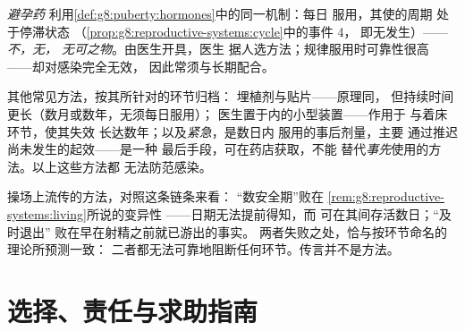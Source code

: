 \begin{definition}\label{def:g8:contraception:pill}
\emph{避孕药}
利用\cref{def:g8:puberty:hormones}中的同一机制：每日
服用，其使的周期
处于停滞状态
（\cref{prop:g8:reproductive-systems:cycle}中的事件 4，
即无发生）——\emph{不，无，
无可之物}。由医生开具，医生
据人选方法；规律服用时可靠性很高
——却对感染完全无效，
因此常须与长期配合。
\end{definition}

\begin{example}\label{ex:g8:contraception:shelf}
其他常见方法，按其所针对的环节归档：
埋植剂与贴片——原理同，
但持续时间更长（数月或数年，无须每日服用）；
医生置于内的小型装置——作用于
与着床环节，使其失效
长达数年；以及\emph{紧急}，是数日内
服用的事后剂量，主要
通过推迟尚未发生的起效——是一种
最后手段，可在药店获取，不能
替代\emph{事先}使用的方法。以上这些方法都
无法防范感染。
\end{example}

\begin{remark}[无效的方法]\label{rem:g8:contraception:notwork}
操场上流传的方法，对照这条链条来看：
“数安全期”败在
\cref{rem:g8:reproductive-systems:living}所说的变异性
——日期无法提前得知，而
可在其间存活数日；“及时退出”
败在早在射精之前就已游出的事实。
两者失败之处，恰与按环节命名的理论所预测一致：
二者都无法可靠地阻断任何环节。传言并不是方法。
\end{remark}

\section{选择、责任与求助指南}

